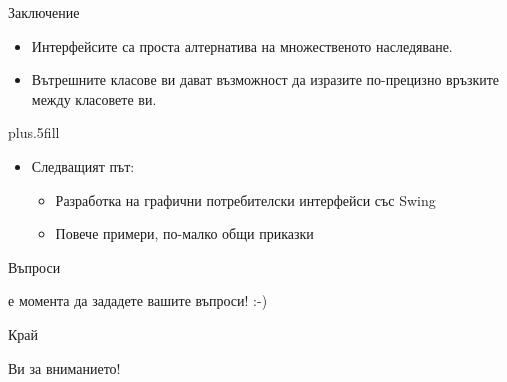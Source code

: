 \documentclass{beamer}
\begin{document}
\begin{frame}{Заключение}
  \transdissolve
  \begin{itemize}
  \item
    Интерфейсите са проста алтернатива на множественото наследяване.
  \item
    Вътрешните класове ви дават възможност да изразите по-прецизно
    връзките между класовете ви.
  \end{itemize}
  
  \vskip0pt plus.5fill
  \begin{itemize}
  \item
    Следващият път:
    \begin{itemize}
    \item
      Разработка на графични потребителски интерфейси със Swing
    \item
      Повече примери, по-малко общи приказки
    \end{itemize}
  \end{itemize}
\end{frame}

\begin{frame}{Въпроси}
  \transdissolve
  \begin{center}
     е момента да зададете вашите въпроси! :-)
  \end{center}
\end{frame}

\begin{frame}{Край}
  \transdissolve
  \begin{center}
     Ви за вниманието!
  \end{center}
\end{frame}
\end{document}
